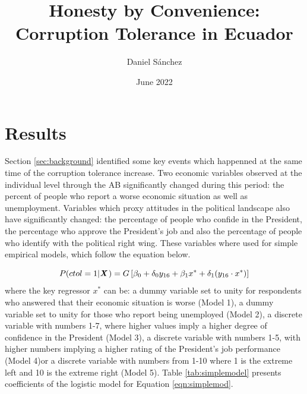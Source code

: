 \documentclass[12pt,a4]{article}
\title{Honesty by Convenience: Corruption Tolerance in Ecuador}
\author{Daniel Sánchez}
\date{June 2022}
\begin{document}

\section{Results}
\label{sec:results}
Section \ref{sec:background} identified some key events which happenned at the same time of the corruption tolerance increase. Two economic variables observed at the individual level through the AB significantly changed during this period: the percent of people who report a worse economic situation as well as unemployment. Variables which proxy attitudes in the political landscape also have significantly changed: the percentage of people who confide in the President, the percentage who approve the President's job and also the percentage of people who identify with the political right wing. These variables where used for simple empirical models, which follow the equation below.

\begin{equation}
\label{eqn:simplemod}
P(ctol = 1 | \textbf{\textit{X}} \hspace{0.04cm}) = G \left[ \beta_0 + \delta_0 y_{16} + \beta_1 x^* + \delta_1 (y_{16} \cdot x^*)\right]
\end{equation}
where the key regressor $x^*$ can be: a dummy variable set to unity for respondents who answered that their economic situation is worse (Model 1), a dummy variable set to unity for those who report being unemployed (Model 2), a discrete variable with numbers 1-7, where higher values imply a higher degree of confidence in the President (Model 3), a discrete variable with numbers 1-5, with higher numbers implying a higher rating of the President's job performance (Model 4)or a discrete variable with numbers from 1-10 where 1 is the extreme left and 10 is the extreme right (Model 5). Table \ref{tab:simplemodel} presents coefficients of the logistic model for Equation \ref{eqn:simplemod}.

\end{document}
